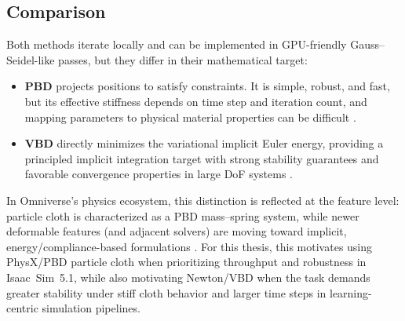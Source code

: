 \subsection{Comparison} %

Both methods iterate locally and can be implemented in \ac{GPU}-friendly Gauss--Seidel-like
passes, but they differ in their mathematical target:
\begin{itemize}
  \item \textbf{\acs{PBD}} projects positions to satisfy constraints. It is simple, robust, and fast,
  but its effective stiffness depends on time step and iteration count, and mapping
  parameters to physical material properties can be difficult \cite{muller2007pbd,macklin2016xpbd,longhini2024review_cloth_manipulation}.
  \item \textbf{\acs{VBD}} directly minimizes the variational implicit Euler energy, providing a
  principled implicit integration target with strong stability guarantees and favorable
  convergence properties in large \ac{DoF} systems \cite{chen2024vbd}.
\end{itemize}
In Omniverse's physics ecosystem, this distinction is reflected at the feature level: particle
cloth is characterized as a \ac{PBD} mass--spring system, while newer deformable features
(and adjacent solvers) are moving toward implicit, energy/compliance-based formulations
\cite{omni_deformable_migration_guide}. For this thesis, this motivates using PhysX/\ac{PBD}
particle cloth when prioritizing throughput and robustness in Isaac~Sim~5.1, while also
motivating Newton/\ac{VBD} when the task demands greater stability under stiff cloth behavior
and larger time steps in learning-centric simulation pipelines.


